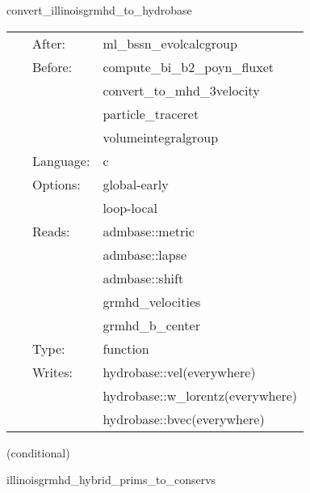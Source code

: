 \documentclass{article}
\begin{document}
\hspace{5mm} convert\_illinoisgrmhd\_to\_hydrobase 

\hspace{5mm}{\it convert illinoisgrmhd-native variables to hydrobase } 


\hspace{5mm}

 \begin{tabular*}{160mm}{cll} 
~ & After:  & ml\_bssn\_evolcalcgroup \\ 
~ & Before:  & compute\_bi\_b2\_poyn\_fluxet \\ 
~& ~ &convert\_to\_mhd\_3velocity\\ 
~& ~ &particle\_traceret\\ 
~& ~ &volumeintegralgroup\\ 
~ & Language:  & c \\ 
~ & Options:  & global-early \\ 
~& ~ &loop-local\\ 
~ & Reads:  & admbase::metric \\ 
~& ~ &admbase::lapse\\ 
~& ~ &admbase::shift\\ 
~& ~ &grmhd\_velocities\\ 
~& ~ &grmhd\_b\_center\\ 
~ & Type:  & function \\ 
~ & Writes:  & hydrobase::vel(everywhere) \\ 
~& ~ &hydrobase::w\_lorentz(everywhere)\\ 
~& ~ &hydrobase::bvec(everywhere)\\ 
\end{tabular*} 


\vspace{5mm}

   (conditional) 

\hspace{5mm} illinoisgrmhd\_hybrid\_prims\_to\_conservs 

\hspace{5mm}{\it hybrid version of illinoisgrmhd\_prims\_to\_conservs } 


\hspace{5mm}
\end{document}
